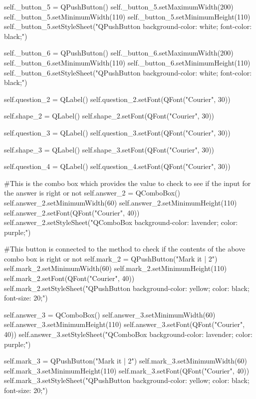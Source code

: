 \begin{landscape}
\begin{python}
        self._button_5 = QPushButton()
        self._button_5.setMaximumWidth(200)
        self._button_5.setMinimumWidth(110)
        self._button_5.setMinimumHeight(110)
        self._button_5.setStyleSheet("QPushButton {background-color: white; font-color: black;}")
        
        self._button_6 = QPushButton()
        self._button_6.setMaximumWidth(200)
        self._button_6.setMinimumWidth(110)
        self._button_6.setMinimumHeight(110)
        self._button_6.setStyleSheet("QPushButton {background-color: white; font-color: black;}")

        self.question_2 = QLabel()       
        self.question_2.setFont(QFont("Courier", 30))
        
        self.shape_2 = QLabel()        
        self.shape_2.setFont(QFont("Courier", 30))
        
        self.question_3 = QLabel()        
        self.question_3.setFont(QFont("Courier", 30))
        
        self.shape_3 = QLabel()       
        self.shape_3.setFont(QFont("Courier", 30))
        
        self.question_4 = QLabel()       
        self.question_4.setFont(QFont("Courier", 30))

        #This is the combo box which provides the value to check to see if the input for the answer is right or not
        self.answer_2 = QComboBox()
        self.answer_2.setMinimumWidth(60)
        self.answer_2.setMinimumHeight(110)
        self.answer_2.setFont(QFont("Courier", 40))
        self.answer_2.setStyleSheet("QComboBox {background-color: lavender; color: purple;}")

        #This button is connected to the method to check if the contents of the above combo box is right or not
        self.mark_2 = QPushButton("Mark it  |  2")
        self.mark_2.setMinimumWidth(60)
        self.mark_2.setMinimumHeight(110)
        self.mark_2.setFont(QFont("Courier", 40))
        self.mark_2.setStyleSheet("QPushButton {background-color: yellow; color: black; font-size: 20;}")
        
        self.answer_3 = QComboBox()
        self.answer_3.setMinimumWidth(60)
        self.answer_3.setMinimumHeight(110)
        self.answer_3.setFont(QFont("Courier", 40))
        self.answer_3.setStyleSheet("QComboBox {background-color: lavender; color: purple;}")
        
        self.mark_3 = QPushButton("Mark it  |  2")
        self.mark_3.setMinimumWidth(60)
        self.mark_3.setMinimumHeight(110)
        self.mark_3.setFont(QFont("Courier", 40))
        self.mark_3.setStyleSheet("QPushButton {background-color: yellow; color: black; font-size: 20;}")


\end{python}
\end{landscape}
